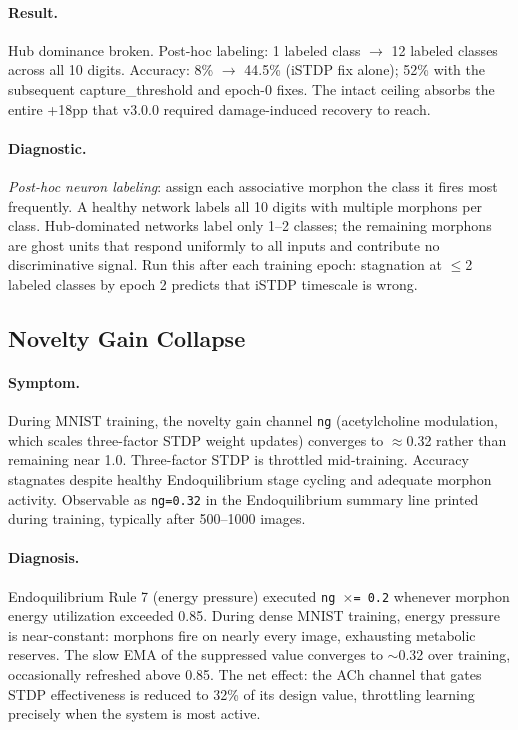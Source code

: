 \paragraph{Result.}
Hub dominance broken. Post-hoc labeling: 1 labeled class $\rightarrow$ 12 labeled classes across all 10 digits. Accuracy: 8\% $\rightarrow$ 44.5\% (iSTDP fix alone); 52\% with the subsequent capture\_threshold and epoch-0 fixes. The intact ceiling absorbs the entire +18pp that v3.0.0 required damage-induced recovery to reach.

\paragraph{Diagnostic.}
\emph{Post-hoc neuron labeling}: assign each associative morphon the class it fires most frequently. A healthy network labels all 10 digits with multiple morphons per class. Hub-dominated networks label only 1--2 classes; the remaining morphons are ghost units that respond uniformly to all inputs and contribute no discriminative signal. Run this after each training epoch: stagnation at $\leq$2 labeled classes by epoch 2 predicts that iSTDP timescale is wrong.

\subsection{Novelty Gain Collapse}
\label{sec:novelty_gain_collapse}

\paragraph{Symptom.}
During MNIST training, the novelty gain channel \texttt{ng} (acetylcholine modulation, which scales three-factor STDP weight updates) converges to $\approx$0.32 rather than remaining near 1.0. Three-factor STDP is throttled mid-training. Accuracy stagnates despite healthy Endoquilibrium stage cycling and adequate morphon activity. Observable as \texttt{ng=0.32} in the Endoquilibrium summary line printed during training, typically after 500--1000 images.

\paragraph{Diagnosis.}
Endoquilibrium Rule 7 (energy pressure) executed \texttt{ng $\times$= 0.2} whenever morphon energy utilization exceeded 0.85. During dense MNIST training, energy pressure is near-constant: morphons fire on nearly every image, exhausting metabolic reserves. The slow EMA of the suppressed value converges to $\sim$0.32 over training, occasionally refreshed above 0.85. The net effect: the ACh channel that gates STDP effectiveness is reduced to 32\% of its design value, throttling learning precisely when the system is most active.

